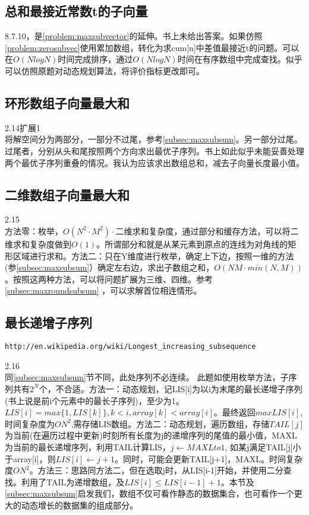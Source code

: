 \subsection{总和最接近常数t的子向量}
\cite{pp}8.7.10，是\ref{problem:maxsubvector}的延伸。书上未给出答案。如果仿照\ref{problem:zerosubvec}使用累加数组，转化为求cum[n]中差值最接近t的问题。可以在$O(NlogN)$时间完成排序，通过$O(NlogN)$时间在有序数组中完成查找。似乎可以仿照原题对动态规划算法，将评价指标更改即可。

\subsection{环形数组子向量最大和}
\cite{bop}2.14扩展1\\
将解空间分为两部分，一部分不过尾，参考\ref{subsec:maxsubsum}。另一部分过尾。过尾者，分别从头和尾按照两个方向求出最优子序列。书上如此似乎未能妥善处理两个最优子序列重叠的情况。我认为应该求出数组总和，减去子向量长度最小值。

\label{subsec:maxroundsubsum}

\subsection{二维数组子向量最大和}
\cite{bop}2.15\\
方法零：枚举，$O(N^2 \cdot M^2) \cdot \textrm{二维求和复杂度}$，通过部分和缓存方法，可以将二维求和复杂度做到$O(1)$。所谓部分和就是从某元素到原点的连线为对角线的矩形区域进行求和。方法二：只在Y维度进行枚举，确定上下边，按照一维的方法(参\ref{subsec:maxsubsum}）确定左右边，求出子数组之和，$O(NM \cdot min(N,M))$。按照这两种方法，可以将问题扩展为三维、四维。参考\ref{subsec:maxroundsubsum} ，可以求解首位相连情形。


\subsection{最长递增子序列}
\begin{verbatim}
http://en.wikipedia.org/wiki/Longest_increasing_subsequence
\end{verbatim}
\cite{bop}2.16\\
同\ref{subsec:maxsubsum}节不同，此处序列不必连续。
此题如使用枚举方法，子序列共有$2^N$个，不合适。方法一：动态规划，记LIS[i]为以i为末尾的最长递增子序列(书上说是前i个元素中的最长子序列)，至少为1。$LIS[i]=max\{1,LIS[k]\}, k<i, array[k]<array[i]$。最终返回$max{LIS[i]}$,时间复杂度为$O{N^2}$,需存储LIS数组。方法二：动态规划，遍历数组，存储$TAIL[j]$为当前(在遍历过程中更新)时刻所有长度为j的递增序列的尾值的最小值，MAXL为当前的最长递增序列，利用TAIL计算LIS，$j \gets MAXL to 1$, 如某j满足TAIL[j]小于array[i]，则$LIS[i] \gets j+1$。同时，可能会更新TAIL[j+1]，MAXL。时间复杂度$O{N^2}$。方法三：思路同方法二，但在选取j时，从LIS[i-1]开始，并使用二分查找。利用了TAIL为递增数组，及$LIS[i] \le LIS[i-1]+1$。本节及\ref{subsec:maxsubsum}启发我们，数组不仅可看作静态的数据集合，也可看作一个更大的动态增长的数据集的组成部分。

